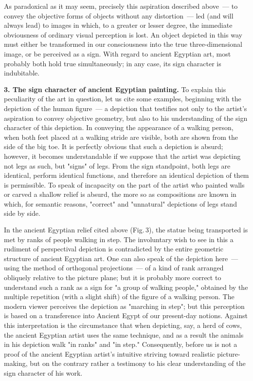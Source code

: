 
As paradoxical as it may seem, precisely this aspiration described above~--- to convey
the objective forms of objects without any distortion~--- led (and will always lead) to
images in which, to a greater or lesser degree, the immediate obviousness of ordinary
visual perception is lost. An object depicted in this way must either be transformed in
our consciousness into the true three-dimensional image, or be perceived as a sign. With
regard to ancient Egyptian art, most probably both hold true simultaneously; in any case,
its sign character is indubitable.

\medskip

\noindent\textbf{3. The sign character of ancient Egyptian painting.} To explain this
peculiarity of the art in question, let us cite some examples, beginning with the
depiction of the human figure~--- a depiction that testifies not only to the artist's
aspiration to convey objective geometry, but also to his understanding of the sign
character of this depiction. In conveying the appearance of a walking person, when both
feet placed at a walking stride are visible, both are shown from the side of the big toe.
It is perfectly obvious that such a depiction is absurd; however, it becomes
understandable if we suppose that the artist was depicting not legs as such, but
"signs" of legs. From the sign standpoint, both legs are identical, perform identical
functions, and therefore an identical depiction of them is permissible. To speak of
incapacity on the part of the artist who painted walls or carved a shallow relief is
absurd, the more so as compositions are known in which, for semantic reasons,
"correct" and "unnatural" depictions of legs stand side by side.


In the ancient Egyptian relief cited above (Fig.\,3), the statue being transported is met
by ranks of people walking in step. The involuntary wish to see in this a rudiment of
perspectival depiction is contradicted by the entire geometric structure of ancient
Egyptian art. One can also speak of the depiction here~--- using the method of
orthogonal projections~--- of a kind of rank arranged obliquely relative to the picture
plane; but it is probably more correct to understand such a rank as a sign for "a group
of walking people," obtained by the multiple repetition (with a slight shift) of the figure
of a walking person. The modern viewer perceives the depiction as "marching in step";
but this perception is based on a transference into Ancient Egypt of our present-day
notions. Against this interpretation is the circumstance that when depicting, say, a herd
of cows, the ancient Egyptian artist uses the same technique, and as a result the animals
in his depiction walk "in ranks" and "in step." Consequently, before us is not a proof of
the ancient Egyptian artist's intuitive striving toward realistic picture-making, but on the
contrary rather a testimony to his clear understanding of the sign character of his work.

